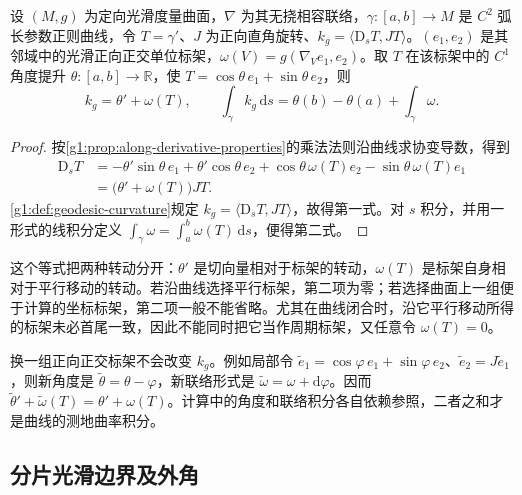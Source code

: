 \begin{proposition}
	\label{g1:prop:tangent-connection-angle}
	设 \((M,g)\) 为定向光滑度量曲面，\(\nabla\) 为其无挠相容联络，\(\gamma:[a,b]\to M\) 是 \(C^2\) 弧长参数正则曲线，令 \(T=\gamma'\)、\(J\) 为正向直角旋转、\(k_g=\langle\mathrm D_sT,JT\rangle\)。\((e_1,e_2)\) 是其邻域中的光滑正向正交单位标架，\(\omega(V)=g(\nabla_Ve_1,e_2)\)。取 \(T\) 在该标架中的 \(C^1\) 角度提升 \(\theta:[a,b]\to\mathbb R\)，使 \(T=\cos\theta\,e_1+\sin\theta\,e_2\)，则
	\begin{equation}
		\label{g1:eq:tangent-connection-angle}
		k_g=\theta'+\omega(T),\qquad
		\int_\gamma k_g\,\mathrm{d}s=\theta(b)-\theta(a)+\int_\gamma\omega.
	\end{equation}
\end{proposition}
\begin{proof}
	按\cref{g1:prop:along-derivative-properties}的乘法法则沿曲线求协变导数，得到
	\begin{align*}
		\mathrm{D}_sT
		&=-\theta'\sin\theta\,e_1+\theta'\cos\theta\,e_2
		+\cos\theta\,\omega(T)e_2-\sin\theta\,\omega(T)e_1\\
		&=\bigl(\theta'+\omega(T)\bigr)JT.
	\end{align*}
	\cref{g1:def:geodesic-curvature}规定 \(k_g=\langle \mathrm{D}_sT,JT\rangle\)，故得第一式。对 \(s\) 积分，并用一形式的线积分定义 \(\int_\gamma\omega=\int_a^b\omega(T)\,\mathrm{d}s\)，便得第二式。
\end{proof}

这个等式把两种转动分开：\(\theta'\) 是切向量相对于标架的转动，\(\omega(T)\) 是标架自身相对于平行移动的转动。若沿曲线选择平行标架，第二项为零；若选择曲面上一组便于计算的坐标标架，第二项一般不能省略。尤其在曲线闭合时，沿它平行移动所得的标架未必首尾一致，因此不能同时把它当作周期标架，又任意令 \(\omega(T)=0\)。

\ProseParagraphBreak

换一组正向正交标架不会改变 \(k_g\)。例如局部令 \(\widetilde e_1=\cos\varphi\,e_1+\sin\varphi\,e_2\)、\(\widetilde e_2=J\widetilde e_1\)，则新角度是 \(\widetilde\theta=\theta-\varphi\)，新联络形式是 \(\widetilde\omega=\omega+\mathrm{d}\varphi\)。因而 \(\widetilde\theta'+\widetilde\omega(T)=\theta'+\omega(T)\)。计算中的角度和联络积分各自依赖参照，二者之和才是曲线的测地曲率积分。

\subsection{分片光滑边界及外角}
\label{g1:subsec:0903:02}

